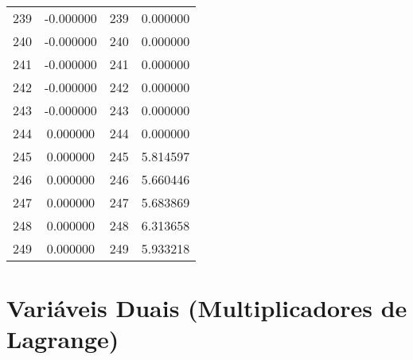 \documentclass[12pt]{article}
\begin{document}
\begin{longtable}{@{}cccc@{}}
239 & -0.000000 & 239 & 0.000000 \\
240 & -0.000000 & 240 & 0.000000 \\
241 & -0.000000 & 241 & 0.000000 \\
242 & -0.000000 & 242 & 0.000000 \\
243 & -0.000000 & 243 & 0.000000 \\
244 & 0.000000 & 244 & 0.000000 \\
245 & 0.000000 & 245 & 5.814597 \\
246 & 0.000000 & 246 & 5.660446 \\
247 & 0.000000 & 247 & 5.683869 \\
248 & 0.000000 & 248 & 6.313658 \\
249 & 0.000000 & 249 & 5.933218 \\

\end{longtable}

\section{Variáveis Duais (Multiplicadores de Lagrange)}
\end{document}
